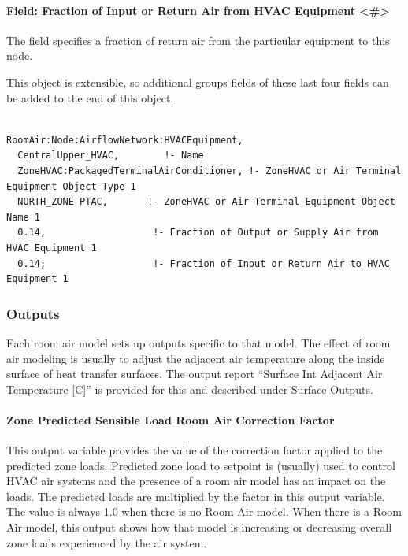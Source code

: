 \paragraph{Field: Fraction of Input or Return Air from HVAC Equipment \textless{}\#\textgreater{}}\label{field-fraction-of-input-or-return-air-from-hvac-equipment-x}

The field specifies a fraction of return air from the particular equipment to this node.

This object is extensible, so additional groups fields of these last four fields can be added to the end of this object.

\begin{lstlisting}

RoomAir:Node:AirflowNetwork:HVACEquipment,
  CentralUpper_HVAC,        !- Name
  ZoneHVAC:PackagedTerminalAirConditioner, !- ZoneHVAC or Air Terminal Equipment Object Type 1
  NORTH_ZONE PTAC,       !- ZoneHVAC or Air Terminal Equipment Object Name 1
  0.14,                   !- Fraction of Output or Supply Air from HVAC Equipment 1
  0.14;                   !- Fraction of Input or Return Air to HVAC Equipment 1
\end{lstlisting}

\subsubsection{Outputs}\label{outputs-1-023}

Each room air model sets up outputs specific to that model. The effect of room air modeling is usually to adjust the adjacent air temperature along the inside surface of heat transfer surfaces. The output report ``Surface Int Adjacent Air Temperature {[}C{]}'' is provided for this and described under Surface Outputs.

\paragraph{Zone Predicted Sensible Load Room Air Correction Factor}\label{zone-predicted-sensible-load-room-air-correction-factor}

This output variable provides the value of the correction factor applied to the predicted zone loads. Predicted zone load to setpoint is (usually) used to control HVAC air systems and the presence of a room air model has an impact on the loads. The predicted loads are multiplied by the factor in this output variable. The value is always 1.0 when there is no Room Air model. When there is a Room Air model, this output shows how that model is increasing or decreasing overall zone loads experienced by the air system.

